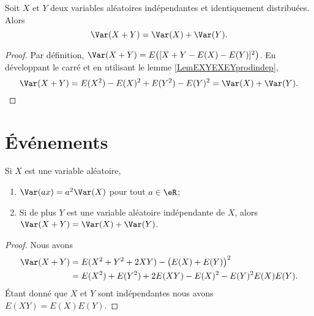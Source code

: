 \begin{lemma}   \label{LemVarXpYsmindep}
    Soit \( X\) et \( Y\) deux variables aléatoires indépendantes et identiquement distribuées. Alors
    \begin{equation}
        \Var(X+Y)=\Var(X)+\Var(Y).
    \end{equation}
\end{lemma}

\begin{proof}
    Par définition, \( \Var(X+Y)=E\big( [X+Y-E(X)-E(Y)]^2 \big)\). En développant le carré et en utilisant le lemme \ref{LemEXYEXEYprodindep},
    \begin{equation}
        \Var(X+Y)=E(X^2)-E(X)^2+E(Y^2)-E(Y)^2=\Var(X)+\Var(Y).
    \end{equation}
\end{proof}

\section{Événements}

\begin{lemma}       \label{LemEXYEXEYindep}\label{PropVarPropnnlin}
    Si \( X\) est une variable aléatoire,
    \begin{enumerate}
        \item
            $\Var(ax)=a^2\Var(X)$ pour tout \( a\in\eR\);
        \item
            Si de plus \( Y\) est une variable aléatoire indépendante de \( X\), alors $\Var(X+Y)=\Var(X)+\Var(Y)$.
    \end{enumerate}
\end{lemma}

\begin{proof}
    Nous avons
    \begin{subequations}
        \begin{align}
            \Var(X+Y)&=E(X^2+Y^2+2XY)-\big( E(X)+E(Y) \big)^2\\
            &=E(X^2)+E(Y^2)+2E(XY)-E(X)^2-E(Y)^2E(X)E(Y).
        \end{align}
    \end{subequations}
    Étant donné que \( X\) et \( Y\) sont indépendantes nous avons \( E(XY)=E(X)E(Y)\).
\end{proof}


